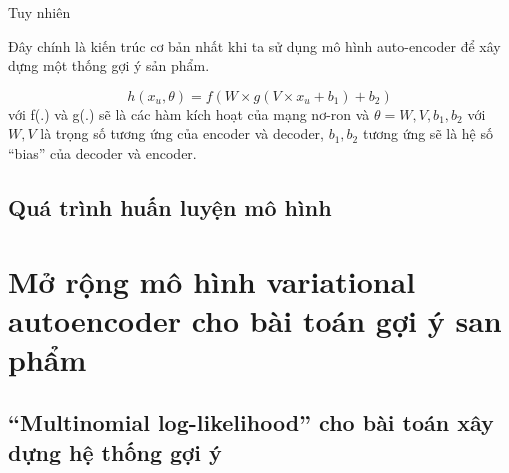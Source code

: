     Tuy nhiên 

    Đây chính là kiến trúc cơ bản nhất khi ta sử dụng mô hình auto-encoder để xây dựng một thống gợi ý sản phẩm.
    

    $$h(x_u,\theta) = f(W \times g(V \times x_u + b_1) + b_2)$$
    với f(.) và g(.) sẽ là các hàm kích hoạt của mạng nơ-ron và $\theta = {W, V, b_1, b_2}$ với $W,V$ là trọng số tương ứng của encoder và decoder, $b_1,b_2$ tương ứng sẽ là hệ số ``bias'' của decoder và encoder.



    \subsection{Quá trình huấn luyện mô hình}

\section{Mở rộng mô hình variational autoencoder cho bài toán gợi ý san phẩm}
    \subsection{``Multinomial log-likelihood'' cho bài toán xây dựng hệ thống gợi ý}